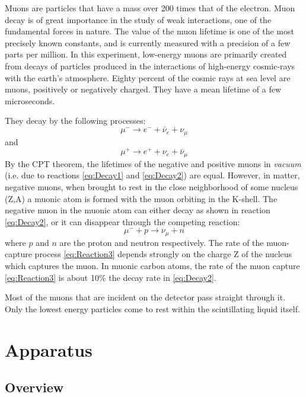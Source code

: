 \documentclass{../lab}
\begin{document}
Muons are particles that have a mass over 200 times that of the electron. Muon decay is of great importance in the study of weak interactions, one of the fundamental forces in nature. The value of the muon lifetime is one of the most precisely known constants, and is currently measured with a precision of a few parts per million. In this experiment, low-energy muons are primarily created from decays of particles produced in the interactions of high-energy cosmic-rays with the earth's atmosphere. Eighty percent of the cosmic rays at sea level are muons, positively or negatively charged. They have a mean lifetime of a few microseconds.

They decay by the following processes:
\begin{equation}
\label{eq:Decay1}
    \mu^-\rightarrow e^-+\bar{\nu}_e+\nu_\mu
\end{equation}
and
\begin{equation}
\label{eq:Decay2}
    \mu^+\rightarrow e^++\nu_e+\bar{\nu}_\mu
\end{equation}
By the CPT theorem, the lifetimes of the negative and positive muons in \emph{vacuum} (i.e. due to reactions \eqref{eq:Decay1} and \eqref{eq:Decay2}) are equal. However, in matter, negative muons, when brought to rest in the close neighborhood of some nucleus (Z,A) a muonic atom is formed with the muon orbiting in the K-shell. The negative muon in the muonic atom can either decay as shown in reaction \eqref{eq:Decay2}, or it can disappear through the competing reaction:
\begin{equation}
\label{eq:Reaction3}
    \mu^- + p \rightarrow \nu_{\mu}+n
\end{equation}
where $p$ and $n$ are the proton and neutron respectively.
The rate of the muon-capture process \eqref{eq:Reaction3} depends strongly on the charge Z of the nucleus which captures the muon. In muonic carbon atoms, the rate of the muon capture \eqref{eq:Reaction3} is about 10\% the decay rate in \eqref{eq:Decay2}.

Most of the muons that are incident on the detector pass straight through it. Only the lowest energy particles come to rest within the scintillating liquid itself.

\section{Apparatus}

\subsection{Overview}
\end{document}
